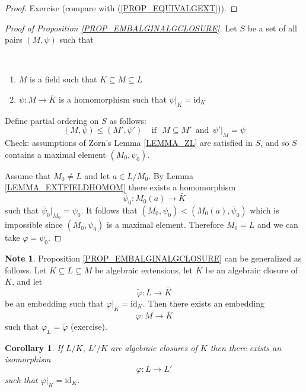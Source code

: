 \documentclass[12pt, letterpaper, oneside]{article}
\theoremstyle{plain}
\newtheorem{corollary}[theorem]{Corollary}
\theoremstyle{definition}
\newtheorem{note}[theorem]{Note}
\newcommand{\id}{\mathrm{id}}
\newcommand{\benu}{\begin{enumerate}}
\newcommand{\eenu}{\end{enumerate}}
\newcommand{\vs}{\vskip 5mm}
\newcommand{\isep}[1][0]{\setlength{\itemsep}{#1 mm}}
\begin{document}
\begin{proof}
Exercise (compare with  (\ref{PROP_EQUIVALGEXT})). 
\end{proof}

\vs\vs

\begin{proof}[Proof of Proposition \ref{PROP_EMBALGINALGCLOSURE}]

Let $S$ be a set of all pairs $(M, \psi)$ such that 

\vskip -13mm

\ 
\benu
\isep[0]
\item[(i)] $M$ is a field such that $K\subseteq M \subseteq L$ 
\item[(ii)] $\psi\colon M \to \bar{K}$ is a homomorphism such that $\psi|_{K} = \id_{K}$
\eenu

Define partial ordering on $S$ as follows:
$$(M, \psi) \leq (M', \psi') \ \ \ \ \  \text{if} \ \ \ M\subseteq M' \ \  \text{and} \ \ \psi'|_{M} = \psi $$
Check: assumptions of Zorn's Lemma \ref{LEMMA_ZL} are satisfied in $S$, and so $S$ contains 
a maximal element $(M_{0}, \psi_{0})$. 

Assume that  $M_{0}\neq L$ and let  $a\in L/ M_{0}$. By 
Lemma \ref{LEMMA_EXTFIELDHOMOM} there exists a homomorphism 
$$\bar{\psi}_{0}\colon M_{0}(a) \to \bar{K}$$ 
such that $\bar{\psi}_{0}|_{M_{0}} = \psi_{0}$. It follows that $(M_{0}, \psi_{0}) < (M_{0}(a), \bar{\psi}_{0})$
which is impossible since $(M_{0}, \psi_{0})$ is a maximal element. Therefore $M_{0} = L$ and we can take
$\varphi = \psi_{0}$.

\end{proof}

\vs\vs


\begin{note}
\label{NOTE_RELEMBALGINALGCLOSURE}
Proposition \ref{PROP_EMBALGINALGCLOSURE} can be generalized as follows. 
Let $K \subseteq L \subseteq M$ be algebraic extensions, let $\bar{K}$ be an algebraic 
closure of $K$, and let
$$\tilde \varphi\colon L \to \bar{K}$$
be an embedding such that $\varphi|_{K} = \id_{K}$. Then there exists an embedding 
$$\varphi\colon M \to \bar{K}$$
such that $\varphi_{L} = \tilde\varphi$ (exercise).
\end{note}


\vs\vs

\begin{corollary}
If $L/K$, $L'/K$ are algebraic closures of $K$ then there exists an isomorphism 
$$\varphi\colon L \to L'$$
such that $\varphi |_{K} = \id_{K}$.
\end{corollary}
\end{document}
